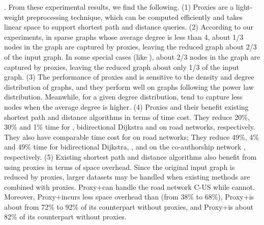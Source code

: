 \vspace{-0.5ex}
.
From these experimental results, we find the following. (1) Proxies are a light-weight preprocessing technique, which can be computed efficiently and takes linear space to support shortest path and distance queries.  (2) According to our experiments, in sparse graphs whose average degree is less than 4, about 1/3 nodes in the graph are captured by proxies, leaving the reduced graph about 2/3 of the input graph. In some special cases (like \dblpone), about 2/3 nodes in the graph are captured by proxies, leaving the reduced graph about only 1/3 of the input graph. (3) The performance of proxies and \dras is sensitive to the density and degree distribution of graphs, and they perform well on graphs following the power law distribution. Meanwhile, for a given degree distribution, \dras tend to capture less nodes when the average degree is higher. (4) Proxies and their \dras benefit existing shortest path and distance algorithms in terms of time cost. They reduce 20\%, 30\% and 1\% time for \arcflag, bidirectional Dijkstra and \ah on road networks, respectively. They also have comparable time cost for \tnr on road networks; They reduce 49\%, 4\% and 49\% time for bidirectional Dijkstra, \arcflag, and \tnr on the co-authorship network \dblpone, respectively. (5) Existing shortest path and distance algorithms also benefit from using proxies in terms of space overhead. Since the original input graph is reduced by proxies, larger datasets may be handled when existing methods are combined with proxies.  Proxy+\tnr can handle the road network C-US while \tnr cannot. Moreover, Proxy+\arcflag incurs less space overhead than \arcflag (from 38\% to 68\%), Proxy+\tnr is about from 72\% to 92\% of its counterpart without proxies, and Proxy+\ah is about 82\% of its counterpart without proxies.


